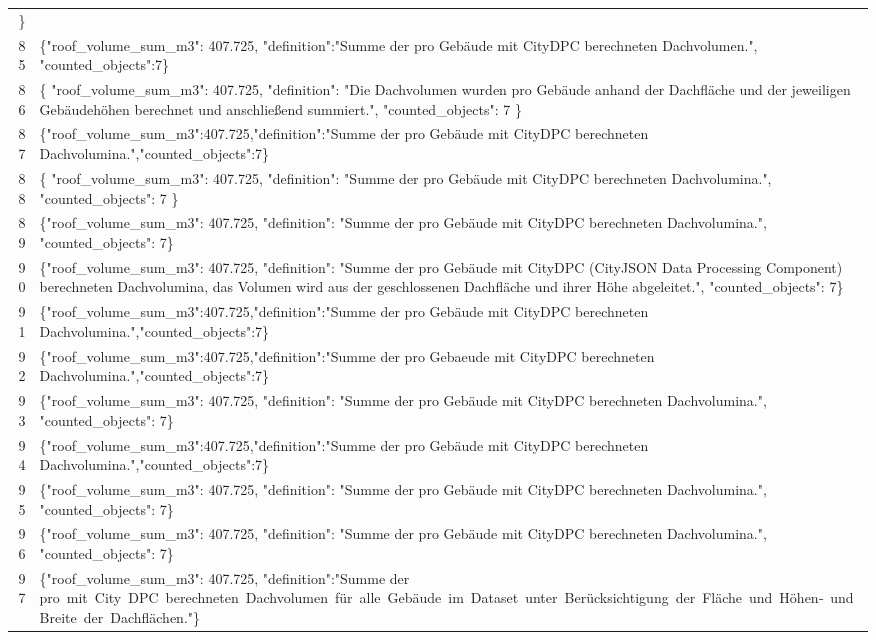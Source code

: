 \documentclass[a4paper,11pt]{article}
\begin{document}
\begin{table}[ht]
\begin{tabular}{r p{12cm}}
\} \\
85 & \{"roof\_volume\_sum\_m3": 407.725, "definition":"Summe der pro Gebäude mit CityDPC berechneten Dachvolumen.", "counted\_objects":7\} \\
86 & \{
  "roof\_volume\_sum\_m3": 407.725,
  "definition": "Die Dachvolumen wurden pro Gebäude anhand der Dachfläche und der jeweiligen Gebäudehöhen berechnet und anschließend summiert.",
  "counted\_objects": 7
\} \\
87 & \{"roof\_volume\_sum\_m3":407.725,"definition":"Summe der pro Gebäude mit CityDPC berechneten Dachvolumina.","counted\_objects":7\} \\
88 & \{
  "roof\_volume\_sum\_m3": 407.725,
  "definition": "Summe der pro Gebäude mit CityDPC berechneten Dachvolumina.",
  "counted\_objects": 7
\} \\
89 & \{"roof\_volume\_sum\_m3": 407.725, "definition": "Summe der pro Gebäude mit CityDPC berechneten Dachvolumina.", "counted\_objects": 7\} \\
90 & \{"roof\_volume\_sum\_m3": 407.725, "definition": "Summe der pro Gebäude mit CityDPC (CityJSON Data Processing Component) berechneten Dachvolumina, das Volumen wird aus der geschlossenen Dachfläche und ihrer Höhe abgeleitet.", "counted\_objects": 7\} \\
91 & \{"roof\_volume\_sum\_m3":407.725,"definition":"Summe der pro Gebäude mit CityDPC berechneten Dachvolumina.","counted\_objects":7\} \\
92 & \{"roof\_volume\_sum\_m3":407.725,"definition":"Summe der pro Gebaeude mit CityDPC berechneten Dachvolumina.","counted\_objects":7\} \\
93 & \{"roof\_volume\_sum\_m3": 407.725, "definition": "Summe der pro Gebäude mit CityDPC berechneten Dachvolumina.", "counted\_objects": 7\} \\
94 & \{"roof\_volume\_sum\_m3":407.725,"definition":"Summe der pro Gebäude mit CityDPC berechneten Dachvolumina.","counted\_objects":7\} \\
95 & \{"roof\_volume\_sum\_m3": 407.725, "definition": "Summe der pro Gebäude mit CityDPC berechneten Dachvolumina.", "counted\_objects": 7\} \\
96 & \{"roof\_volume\_sum\_m3": 407.725, "definition": "Summe der pro Gebäude mit CityDPC berechneten Dachvolumina.", "counted\_objects": 7\} \\
97 & \{"roof\_volume\_sum\_m3": 407.725, "definition":"Summe der pro mit City DPC berechneten Dachvolumen für alle Gebäude im Dataset unter Berücksichtigung der Fläche und Höhen‑ und Breite der Dachflächen."\} \\

\end{tabular}
\end{table}
\end{document}
